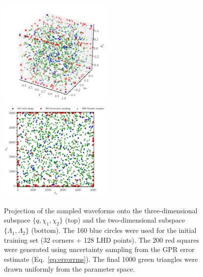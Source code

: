 \documentclass[prd,aps,letter,twocolumn,floatfix,notitlepage,nofootinbib]{revtex4-1}
\begin{document}
\begin{figure}[htb]
\centering
\includegraphics[width=0.49\textwidth]{trainingset3d.pdf}\\
\includegraphics[width=0.49\textwidth]{trainingset2d.pdf}
\caption{Projection of the sampled waveforms onto the three-dimensional subspace $\{q, \chi_1, \chi_2\}$ (top) and the two-dimensional subspace $\{\Lambda_1, \Lambda_2\}$ (bottom). The 160 blue circles were used for the initial training set (32 corners + 128 LHD points). The 200 red squares were generated using uncertainty sampling from the GPR error estimate (Eq.~\eqref{eq:errorrms}). The final 1000 green triangles were drawn uniformly from the parameter space.
}
\label{fig:LHD}
\end{figure}
\end{document}
